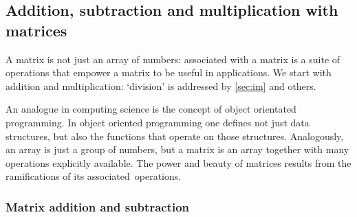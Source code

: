 \subsection{Addition, subtraction and multiplication with matrices}
\label{sec:amwm}

A matrix is not just an array of numbers: associated with a matrix is a suite of operations that empower a matrix to be useful in applications.
We start with addition and multiplication: `division' is addressed by \autoref{sec:im} and others.

An analogue in computing science is the concept of object orientated programming.
In object oriented programming one defines not just data structures, but also the functions that operate on those structures.
Analogously, an array is just a group of numbers, but a matrix is an array together with many operations explicitly available. 
The power and beauty of matrices results from the ramifications of its associated~operations.


\subsubsection{Matrix addition and subtraction}

